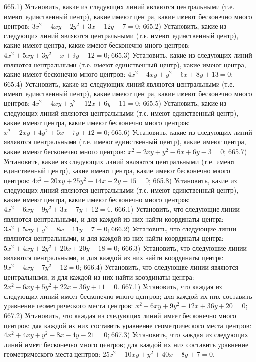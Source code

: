 665.1) Установить, какие из следующих линий являются центральными (т.е. имеют единственный центр), какие имеют центра, какие имеют бесконечно много центров: $3 x^2-4 x y-2 y^2+3 x-12 y-7=0$;
665.2) Установить, какие из следующих линий являются центральными (т.е. имеют единственный центр), какие имеют центра, какие имеют бесконечно много центров: $4 x^2+5 x y+3 y^2-x+9 y-12=0$;
665.3) Установить, какие из следующих линий являются центральными (т.е. имеют единственный центр), какие имеют центра, какие имеют бесконечно много центров: $4 x^2-4 x y+y^2-6 x+8 y+13=0$;
665.4) Установить, какие из следующих линий являются центральными (т.е. имеют единственный центр), какие имеют центра, какие имеют бесконечно много центров: $4 x^2-4 x y+y^2-12 x+6 y-11=0$;
665.5) Установить, какие из следующих линий являются центральными (т.е. имеют единственный центр), какие имеют центра, какие имеют бесконечно много центров: $x^2-2 x y+4 y^2+5 x-7 y+12=0$;
665.6) Установить, какие из следующих линий являются центральными (т.е. имеют единственный центр), какие имеют центра, какие имеют бесконечно много центров: $x^2-2 x y+y^2-6 x+6 y-3=0$;
665.7) Установить, какие из следующих линий являются центральными (т.е. имеют единственный центр), какие имеют центра, какие имеют бесконечно много центров: $4 x^2-20 x y+25 y^2-14 x+2 y-15=0$;
665.8) Установить, какие из следующих линий являются центральными (т.е. имеют единственный центр), какие имеют центра, какие имеют бесконечно много центров: $4 x^2-6 x y-9 y^2+3 x-7 y+12=0$.
666.1) Установить, что следующие линии являются центральными, и для каждой из них найти координаты центра: $3 x^2+5 x y+y^2-8 x-11 y-7=0$;
666.2) Установить, что следующие линии являются центральными, и для каждой из них найти координаты центра: $5 x^2+4 x y+2 y^2+20 x+20 y-18=0$;
666.3) Установить, что следующие линии являются центральными, и для каждой из них найти координаты центра: $9 x^2-4 x y-7 y^2-12=0$;
666.4) Установить, что следующие линии являются центральными, и для каждой из них найти координаты центра: $2 x^2-6 x y+5 y^2+22 x-36 y+11=0$.
667.1) Установить, что каждая из следующих линий имєет бесконечно много цєнтров; для каждой их них составить уравнение геометрического места центров: $x^2-6 x y+9 y^2-12 x+36 y+20=0$;
667.2) Установить, что каждая из следующих линий имєет бесконечно много цєнтров; для каждой их них составить уравнение геометрического места центров: $4 x^2+4 x y+y^2-8 x-4 y-21=0$;
667.3) Установить, что каждая из следующих линий имєет бесконечно много цєнтров; для каждой их них составить уравнение геометрического места центров: $25 x^2-10 x y+y^2+40 x-8 y+7=0$.
